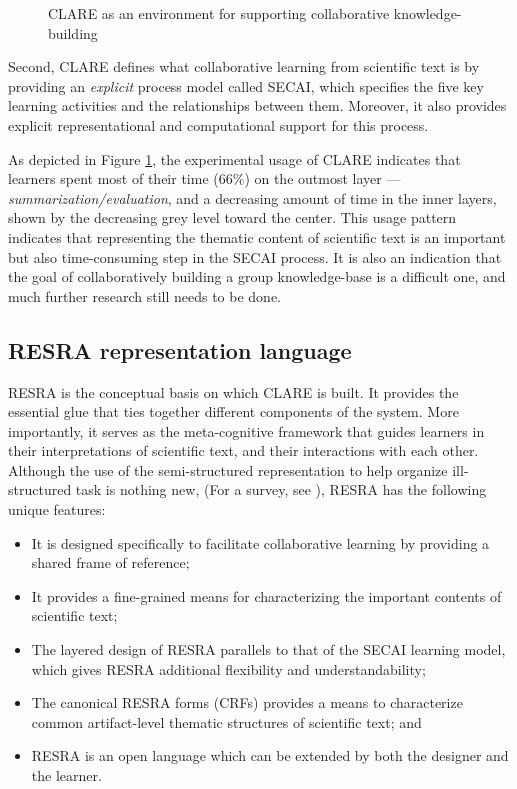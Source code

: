 \begin{figure}[htbp]
 \caption{CLARE as an environment for supporting collaborative knowledge-building}
  \label{fig:clst} 
\end{figure}

Second, CLARE defines what collaborative learning from scientific text is
by providing an {\it explicit\/} process model called SECAI, which
specifies the five key learning activities and the relationships between
them. Moreover, it also provides explicit representational and
computational support for this process.

As depicted in Figure \ref{fig:clst}, the experimental usage of CLARE
indicates that learners spent most of their time (66\%) on the outmost
layer --- {\it summarization/evaluation\/}, and a decreasing amount of time
in the inner layers, shown by the decreasing grey level toward the
center. This usage pattern indicates that representing the thematic content
of scientific text is an important but also time-consuming step in the
SECAI process. It is also an indication that the goal of collaboratively
building a group knowledge-base is a difficult one, and much further
research still needs to be done.


\subsection{RESRA representation language}

RESRA is the conceptual basis on which CLARE is built. It provides the
essential glue that ties together different components of the system.  More
importantly, it serves as the meta-cognitive framework that guides learners
in their interpretations of scientific text, and their interactions with
each other. Although the use of the semi-structured representation to help
organize ill-structured task is nothing new, (For a survey, see
\cite{Lee91What}), RESRA has the following unique features:

\begin{itemize}
\item It is designed specifically to facilitate collaborative learning by
  providing a shared frame of reference;
  
\item It provides a fine-grained means for characterizing the important
  contents of scientific text;
  
\item The layered design of RESRA parallels to that of the SECAI learning
  model, which gives RESRA additional flexibility and understandability;
  
\item The canonical RESRA forms (CRFs) provides a means to characterize
  common artifact-level thematic structures of scientific text; and
    
\item RESRA is an open language which can be extended by both the
  designer and the learner.
\end{itemize}

